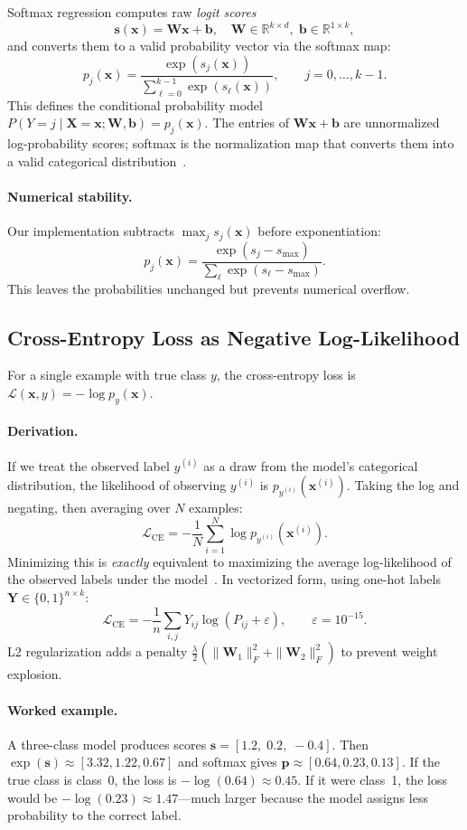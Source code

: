 \documentclass[11pt]{article}
\newcommand{\R}{\mathbb{R}}
\newcommand{\W}{\mathbf{W}}
\newcommand{\bx}{\mathbf{x}}
\newcommand{\bb}{\mathbf{b}}
\newcommand{\bs}{\mathbf{s}}
\newcommand{\bp}{\mathbf{p}}
\newcommand{\bX}{\mathbf{X}}
\newcommand{\bY}{\mathbf{Y}}
\newcommand{\loss}{\mathcal{L}}
\begin{document}
Softmax regression computes raw \emph{logit scores}
\[
  \bs(\bx)=\W\bx+\bb,\quad \W\in\R^{k\times d},\;\bb\in\R^{1\times k},
\]
and converts them to a valid probability vector via the softmax map:
\[
  p_j(\bx)=\frac{\exp(s_j(\bx))}{\displaystyle\sum_{\ell=0}^{k-1}\exp(s_\ell(\bx))},
  \qquad j=0,\ldots,k-1.
\]
This defines the conditional probability model
$P(Y=j\mid\bX=\bx;\W,\bb)=p_j(\bx)$.
The entries of $\W\bx+\bb$ are unnormalized log-probability scores; softmax is
the normalization map that converts them into a valid categorical
distribution~\cite{murphy2022,ng_deep}.

\paragraph{Numerical stability.}
Our implementation subtracts $\max_j s_j(\bx)$ before exponentiation:
\[
  p_j(\bx)=\frac{\exp(s_j-s_{\max})}{\sum_\ell\exp(s_\ell-s_{\max})}.
\]
This leaves the probabilities unchanged but prevents numerical overflow.

\subsection{Cross-Entropy Loss as Negative Log-Likelihood}
\label{subsec:nll}

For a single example with true class $y$, the cross-entropy loss is
$\loss(\bx,y)=-\log p_y(\bx)$.

\paragraph{Derivation.}
If we treat the observed label $y^{(i)}$ as a draw from the model's categorical
distribution, the likelihood of observing $y^{(i)}$ is $p_{y^{(i)}}(\bx^{(i)})$.
Taking the log and negating, then averaging over $N$ examples:
\[
  \loss_{\mathrm{CE}}
  =-\frac{1}{N}\sum_{i=1}^{N}\log p_{y^{(i)}}(\bx^{(i)}).
\]
Minimizing this is \emph{exactly} equivalent to maximizing the average
log-likelihood of the observed labels under the model~\cite{murphy2022,goodfellow2016}.
In vectorized form, using one-hot labels $\bY\in\{0,1\}^{n\times k}$:
\[
  \loss_{\mathrm{CE}}
  =-\frac{1}{n}\sum_{i,j}Y_{ij}\log(P_{ij}+\varepsilon),
  \qquad\varepsilon=10^{-15}.
\]
L2 regularization adds a penalty
$\tfrac{\lambda}{2}(\|\W_1\|_F^2+\|\W_2\|_F^2)$ to prevent weight explosion.

\paragraph{Worked example.}
A three-class model produces scores $\bs=[1.2,\;0.2,\;-0.4]$.
Then $\exp(\bs)\approx[3.32,1.22,0.67]$ and softmax gives
$\bp\approx[0.64,0.23,0.13]$.
If the true class is class~0, the loss is $-\log(0.64)\approx0.45$.
If it were class~1, the loss would be $-\log(0.23)\approx1.47$---much larger
because the model assigns less probability to the correct label.
\end{document}
